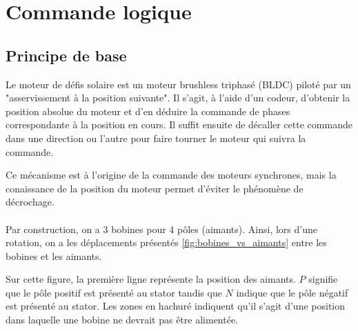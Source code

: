 \section{Commande logique}
\subsection{Principe de base}
\label{seq:cmd_principes_base}
Le moteur de défis solaire est un moteur brushless triphasé (BLDC) piloté par un "asservissement à la position suivante".
Il s'agit, à l'aide d'un codeur, d'obtenir la position absolue du moteur et d'en déduire la commande de phases correspondante à la position en cours.
Il suffit ensuite de décaller cette commande dans une direction ou l'autre pour faire tourner le moteur qui suivra la commande.

Ce mécanisme est à l'origine de la commande des moteurs synchrones, mais la conaissance de la position du moteur permet d'éviter le phénomène de décrochage.

\paragraph{}
Par construction, on a 3 bobines pour 4 pôles (aimants). Ainsi, lors d'une rotation, on a les déplacements présentés 
\cref{fig:bobines_vs_aimants} entre les bobines et les aimants.

Sur cette figure, la première ligne représente la position des aimants. $P$ signifie que le pôle positif est présenté au stator tandis que $N$ indique que le pôle négatif est présenté au stator.
Les zones en hachuré indiquent qu'il s'agit d'une position dans laquelle une bobine ne devrait pas être alimentée.

